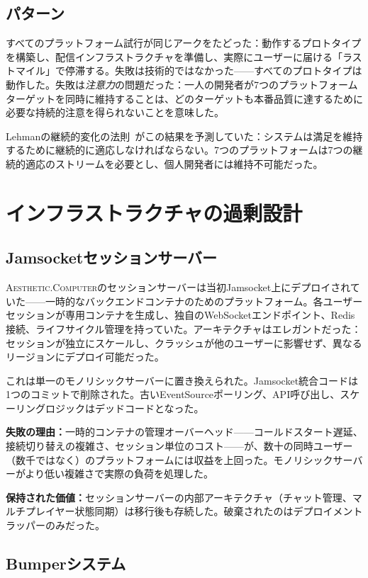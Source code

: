 \documentclass[10pt,letterpaper,twocolumn]{article}
\newcommand{\ac}{\textsc{Aesthetic.Computer}}
\begin{document}
\subsection{パターン}

すべてのプラットフォーム試行が同じアークをたどった：動作するプロトタイプを構築し、配信インフラストラクチャを準備し、実際にユーザーに届ける「ラストマイル」で停滞する。失敗は技術的ではなかった——すべてのプロトタイプは動作した。失敗は\emph{注意力}の問題だった：一人の開発者が7つのプラットフォームターゲットを同時に維持することは、どのターゲットも本番品質に達するために必要な持続的注意を得られないことを意味した。

Lehmanの継続的変化の法則~\citep{lehman1980programs}がこの結果を予測していた：システムは満足を維持するために継続的に適応しなければならない。7つのプラットフォームは7つの継続的適応のストリームを必要とし、個人開発者には維持不可能だった。

\section{インフラストラクチャの過剰設計}

\subsection{Jamsocketセッションサーバー}

\ac{}のセッションサーバーは当初Jamsocket上にデプロイされていた——一時的なバックエンドコンテナのためのプラットフォーム。各ユーザーセッションが専用コンテナを生成し、独自のWebSocketエンドポイント、Redis接続、ライフサイクル管理を持っていた。アーキテクチャはエレガントだった：セッションが独立にスケールし、クラッシュが他のユーザーに影響せず、異なるリージョンにデプロイ可能だった。

これは単一のモノリシックサーバーに置き換えられた。Jamsocket統合コードは1つのコミットで削除された。古いEventSourceポーリング、API呼び出し、スケーリングロジックはデッドコードとなった。

\textbf{失敗の理由：}一時的コンテナの管理オーバーヘッド——コールドスタート遅延、接続切り替えの複雑さ、セッション単位のコスト——が、数十の同時ユーザー（数千ではなく）のプラットフォームには収益を上回った。モノリシックサーバーがより低い複雑さで実際の負荷を処理した。

\textbf{保持された価値：}セッションサーバーの内部アーキテクチャ（チャット管理、マルチプレイヤー状態同期）は移行後も存続した。破棄されたのはデプロイメントラッパーのみだった。

\subsection{Bumperシステム}
\end{document}
